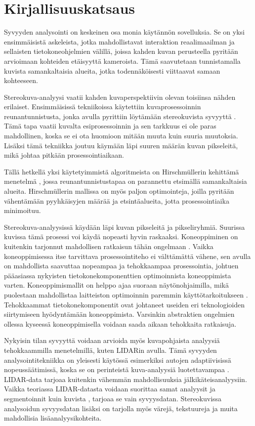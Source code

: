 \chapter{Kirjallisuuskatsaus}%
\label{ch:kirjallisuuskatsaus}

Syvyyden analysointi on keskeinen osa monia käytännön sovelluksia.  
Se on yksi ensimmäisistä askeleista, jotka mahdollistavat interaktion reaalimaailman ja sellaisten tietokoneohjelmien välillä,  
joissa kahden kuvan perusteella pyritään arvioimaan kohteiden etäisyyttä kameroista.  
Tämä saavutetaan tunnistamalla kuvista samankaltaisia alueita, jotka todennäköisesti viittaavat samaan kohteeseen.

Stereokuva-analyysi vaatii kahden kuvaperspektiivin olevan toisiinsa nähden erilaiset.  
Ensimmäisissä tekniikoissa käytettiin kuvaprosessoinnin reunantunnistusta, jonka avulla pyrittiin löytämään stereokuvista syvyyttä \cite{BakerHenryHarlyn1982DfEa}.  
Tämä tapa vaatii kuvalta esiprosessoinnin ja sen tarkkuus ei ole paras mahdollinen, koska se ei ota huomioon mitään muuta kuin suuria muutoksia.
Lisäksi tämä tekniikka joutuu käymään läpi suuren määrän kuvan pikseleitä, mikä johtaa pitkään prosessointiaikaan.

Tällä hetkellä yksi käytetyimmistä algoritmeista on Hirschmüllerin kehittämä menetelmä \cite{hirschmuller2005babel},  
jossa reunantunnistustapaa on parannettu etsimällä samankaltaisia alueita.  
Hirschmüllerin mallissa on myös paljon optimointeja, joilla pyritään vähentämään pyyhkäisyjen määrää ja etsintäalueita, jotta prosessointiaika minimoituu. 

Stereokuva-analyysissä käydään läpi kuvan pikseleitä ja pikseliryhmiä.  
Suurissa kuvissa tämä prosessi voi käydä nopeasti hyvin raskaaksi. 
Koneoppiminen on kuitenkin tarjonnut mahdollisen ratkaisun tähän ongelmaan \cite{LagaHamid2022ASoD}.  
Vaikka koneoppimisessa itse tarvittava prosessointiteho ei välttämättä vähene,
sen avulla on mahdollista saavuttaa nopeampaa ja tehokkaampaa prosessointia,
johtuen pääasiassa nykyisten tietokonekomponenttien optimoinnista koneoppimista varten.  
Koneoppimismallit on helppo ajaa suoraan näytönohjaimilla, mikä puolestaan mahdollistaa laitteiston optimoinnin paremmin käyttötarkoitukseen \cite{LeeVictorW2010Dt1G}.
Tehokkaammat tietokonekomponentit ovat johtaneet useiden eri teknologioiden siirtymiseen hyödyntämään koneoppimista.
Varsinkin abstraktien ongelmien ollessa kyseessä koneoppimisella voidaan saada aikaan tehokkaita ratkaisuja.


Nykyisin tilan syvyyttä voidaan arvioida myös kuvapohjaista analyysiä tehokkaammilla menetelmillä, kuten LIDARin avulla.
Tämä syvyyden analysointitekniikka on yleisesti käytössä esimerkiksi autojen adaptiivisissä nopeussäätimissä, koska se on perinteistä kuva-analyysiä luotettavampaa \cite{RorizRicardo2022ALTA}.
LIDAR-data tarjoaa kuitenkin vähemmän mahdollisuuksia jälkikäteisanalyysiin.  
Vaikka teoriassa LIDAR-datasta voidaan suorittaa samat analyysit ja segmentoinnit kuin kuvista \cite{SunJiaming2020DRS3}, tarjoaa se vain syvyysdatan.
Stereokuvissa analysoidun syvyysdatan lisäksi on tarjolla myös värejä, tekstuureja ja muita mahdollisia lisäanalyysikohteita.  

